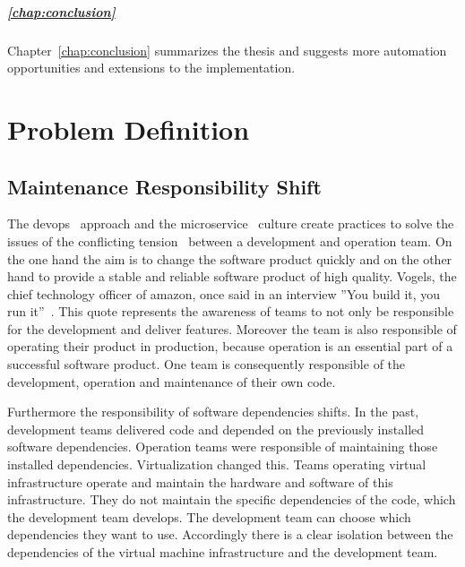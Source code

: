 \paragraph{\ref{chap:conclusion} }
Chapter~\ref{chap:conclusion} summarizes the thesis and suggests more automation
opportunities and extensions to the implementation.

\chapter{Problem Definition}
\label{chap:problem}

\section{Maintenance Responsibility Shift}

The devops~\cite{devops_definition} approach and the
microservice~\cite{microservices_fowler} culture create practices to solve the issues of
the conflicting tension~\cite{sre_intro} between a development and operation team. On the
one hand the aim is to change the software product quickly and on the other hand to
provide a stable and reliable software product of high quality. Vogels, the chief
technology officer of amazon, once said in an interview ”You build it, you run
it”~\cite{build_run}. This quote represents the awareness of teams to not only be
responsible for the development and deliver features. Moreover the team is also
responsible of operating their product in production, because operation is an essential
part of a successful software product. One team is consequently responsible of the
development, operation and maintenance of their own code.

Furthermore the responsibility of software dependencies shifts. In the past, development
teams delivered code and depended on the previously installed software
dependencies. Operation teams were responsible of maintaining those installed
dependencies. Virtualization changed this. Teams operating virtual infrastructure operate
and maintain the hardware and software of this infrastructure. They do not maintain the
specific dependencies of the code, which the development team develops. The development
team can choose which dependencies they want to use. Accordingly there is a clear
isolation between the dependencies of the virtual machine infrastructure and the
development team.

